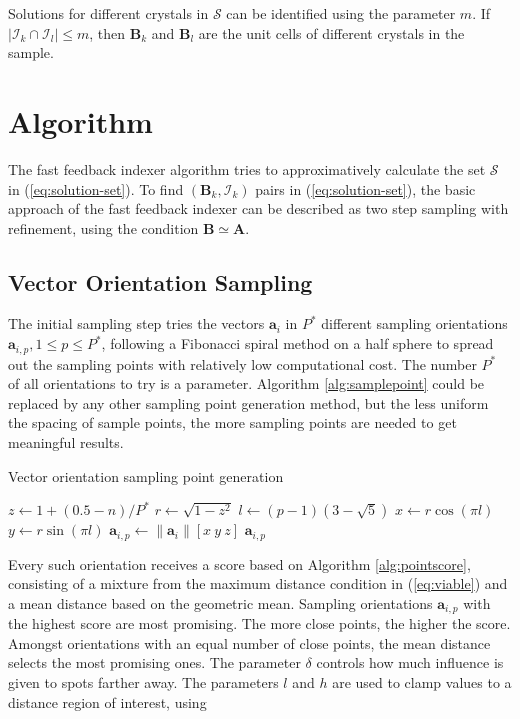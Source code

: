\documentclass[a4paper,10pt]{article}
\newcommand{\vect}[1]{\mathbf{#1}}
\newcommand{\mat}[1]{\mathbf{#1}}
\begin{document}
Solutions for different crystals in $\mathcal{S}$ can be identified using the parameter $m$. If $|\mathcal{I}_k \cap \mathcal{I}_l | \leq m$, then $\mat{B}_k$ and $\mat{B}_l$ are the unit cells of different crystals in the sample.

\section{Algorithm}

The fast feedback indexer algorithm tries to approximatively calculate the set $\mathcal{S}$ in (\ref{eq:solution-set}). To find $(\mat{B}_k,\mathcal{I}_k)$ pairs in (\ref{eq:solution-set}), the basic approach of the fast feedback indexer can be described as two step sampling with refinement, using the condition $\mat{B} \simeq \mat{A}$.

\subsection{Vector Orientation Sampling}\label{subsec:vecsampling}
The initial sampling step tries the vectors $\vect{a}_i$ in $P^*$ different sampling orientations $\vect{a}_{i,p}, 1\leq p\leq P^*$, following a Fibonacci spiral method \cite{gonzales} on a half sphere to spread out the sampling points with relatively low computational cost. The number $P^*$ of all orientations to try is a parameter. Algorithm \ref{alg:samplepoint} could be replaced by any other sampling point generation method, but the less uniform the spacing of sample points, the more sampling points are needed to get meaningful results.

\begin{algorithm}
\caption{Vector orientation sampling point generation}
\label{alg:samplepoint}
\begin{algorithmic}[1]
\Function{sample-point}{$\vect{a}_i,p,P^*$}
\State $z\gets 1 + (0.5 - n)/P^*$
\State $r\gets \sqrt{1 - z^2}$
\State $l\gets (p - 1)(3 - \sqrt{5})$
\State $x\gets r \cos(\pi l)$
\State $y\gets r \sin(\pi l)$
\State $\vect{a}_{i,p}\gets \|\vect{a}_i\| [x\ y\ z]$
\State \Return $\vect{a}_{i,p}$
\EndFunction
\end{algorithmic}
\end{algorithm}

Every such orientation receives a score based on Algorithm \ref{alg:pointscore}, consisting of a mixture from the maximum distance condition in (\ref{eq:viable}) and a mean distance based on the geometric mean. Sampling orientations $\vect{a}_{i,p}$ with the highest score are most promising. The more close points, the higher the score. Amongst orientations with an equal number of close points, the mean distance selects the most promising ones. The parameter $\delta$ controls how much influence is given to spots farther away. The parameters $l$ and $h$ are used to clamp values to a distance region of interest, using
\end{document}
